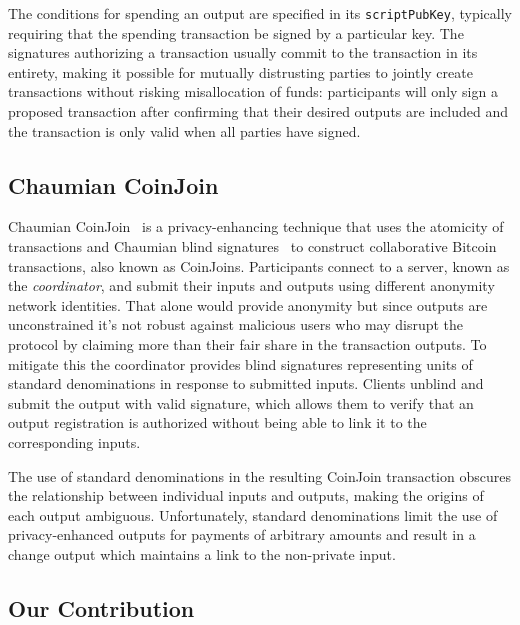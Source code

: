 \documentclass[a4paper]{article}
\begin{document}
The conditions for spending an output are specified in its \texttt{scriptPubKey}, typically requiring that the spending transaction be signed by a particular key. The signatures authorizing a transaction usually commit to the transaction in its entirety, making it possible for mutually distrusting parties to jointly create transactions without risking misallocation of funds: participants will only sign a proposed transaction after confirming that their desired outputs are included and the transaction is only valid when all parties have signed.

\subsection{Chaumian CoinJoin}

Chaumian CoinJoin~\cite{mizrahi2013blind,maxwell2013coinjoin,zerolink} is a privacy-enhancing technique that uses the atomicity of transactions and Chaumian blind signatures~\cite{chaum1983blind} to construct collaborative Bitcoin transactions, also known as CoinJoins. Participants connect to a server, known as the \emph{coordinator}, and submit their inputs and outputs using different anonymity network identities. That alone would provide anonymity but since outputs are unconstrained it's not robust against malicious users who may disrupt the protocol by claiming more than their fair share in the transaction outputs. To mitigate this the coordinator provides blind signatures representing units of standard denominations in response to submitted inputs. Clients unblind and submit the output with valid signature, which allows them to verify that an output registration is authorized without being able to link it to the corresponding inputs.

The use of standard denominations in the resulting CoinJoin transaction obscures the relationship between individual inputs and outputs, making the origins of each output ambiguous. Unfortunately, standard denominations limit the use of privacy-enhanced outputs for payments of arbitrary amounts and result in a change output which maintains a link to the non-private input.

\subsection{Our Contribution}
\end{document}
